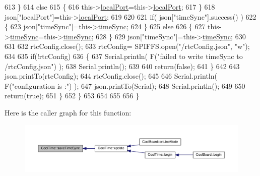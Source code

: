 \begin{DoxyCode}
613             \}
614             \textcolor{keywordflow}{else}
615             \{
616                 this->\hyperlink{classCoolTime_a2f777da44d7ba678be8185299e9b49d1}{localPort}=this->\hyperlink{classCoolTime_a2f777da44d7ba678be8185299e9b49d1}{localPort};
617             \}
618             json[\textcolor{stringliteral}{"localPort"}]=this->\hyperlink{classCoolTime_a2f777da44d7ba678be8185299e9b49d1}{localPort};
619 
620 
621             \textcolor{keywordflow}{if}( json[\textcolor{stringliteral}{"timeSync"}].success() )
622             \{
623                 json[\textcolor{stringliteral}{"timeSync"}]=this->\hyperlink{classCoolTime_a9d032e76c3470a15b3bbbc52af6463f7}{timeSync};
624             \}
625             \textcolor{keywordflow}{else}
626             \{
627                 this->\hyperlink{classCoolTime_a9d032e76c3470a15b3bbbc52af6463f7}{timeSync}=this->\hyperlink{classCoolTime_a9d032e76c3470a15b3bbbc52af6463f7}{timeSync};
628             \}
629             json[\textcolor{stringliteral}{"timeSync"}]=this->\hyperlink{classCoolTime_a9d032e76c3470a15b3bbbc52af6463f7}{timeSync};
630 
631 
632             rtcConfig.close();
633             rtcConfig= SPIFFS.open(\textcolor{stringliteral}{"/rtcConfig.json"}, \textcolor{stringliteral}{"w"});
634             
635             \textcolor{keywordflow}{if}(!rtcConfig)
636             \{
637                 Serial.println( F(\textcolor{stringliteral}{"failed to write timeSync to /rtcConfig.json"}) );
638                 Serial.println();
639 
640                 \textcolor{keywordflow}{return}(\textcolor{keyword}{false});
641             \}
642             
643             json.printTo(rtcConfig);
644             rtcConfig.close();
645 
646             Serial.println( F(\textcolor{stringliteral}{"configuration is :"}) );
647             json.printTo(Serial);
648             Serial.println();
649         
650             \textcolor{keywordflow}{return}(\textcolor{keyword}{true}); 
651         \}
652     \}   
653 
654 
655 
656 \}
\end{DoxyCode}
Here is the caller graph for this function\+:\nopagebreak
\begin{figure}[H]
\begin{center}
\leavevmode
\includegraphics[width=350pt]{classCoolTime_ae9658c9b377510d469e3b88edf33ee85_icgraph}
\end{center}
\end{figure}
\mbox{\label{classCoolTime_a236a38d120dc53bc67456d763838c5a1}} 
